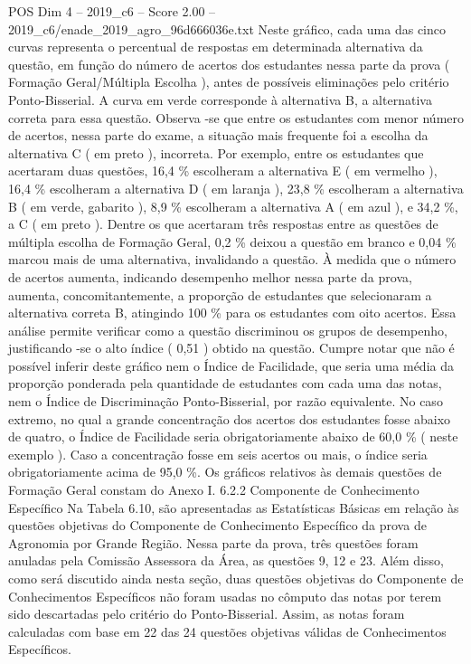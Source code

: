 \begin{textsample}{POS Dim 4 – 2019\_c6 – Score 2.00 – 2019\_c6/enade\_2019\_agro\_96d666036e.txt}
Neste gráfico, cada uma das cinco curvas representa o percentual de respostas em determinada alternativa da questão, em função do número de acertos dos estudantes nessa parte da prova ( Formação Geral/Múltipla Escolha ), antes de possíveis eliminações pelo critério Ponto-Bisserial.
A curva em verde corresponde à alternativa B, a alternativa correta para essa questão.
Observa -se que entre os estudantes com menor número de acertos, nessa parte do exame, a situação mais frequente foi a escolha da alternativa C ( em preto ), incorreta.
Por exemplo, entre os estudantes que acertaram duas questões, 16,4 \% escolheram a alternativa E ( em vermelho ), 16,4 \% escolheram a alternativa D ( em laranja ), 23,8 \% escolheram a alternativa B ( em verde, gabarito ), 8,9 \% escolheram a alternativa A ( em azul ), e 34,2 \%, a C ( em preto ).
Dentre os que acertaram três respostas entre as questões de múltipla escolha de Formação Geral, 0,2 \% deixou a questão em branco e 0,04 \% marcou mais de uma alternativa, invalidando a questão.
À medida que o número de acertos aumenta, indicando desempenho melhor nessa parte da prova, aumenta, concomitantemente, a proporção de estudantes que selecionaram a alternativa correta B, atingindo 100 \% para os estudantes com oito acertos.
Essa análise permite verificar como a questão discriminou os grupos de desempenho, justificando -se o alto índice ( 0,51 ) obtido na questão.
Cumpre notar que não é possível inferir deste gráfico nem o Índice de Facilidade, que seria uma média da proporção ponderada pela quantidade de estudantes com cada uma das notas, nem o Índice de Discriminação Ponto-Bisserial, por razão equivalente.
No caso extremo, no qual a grande concentração dos acertos dos estudantes fosse abaixo de quatro, o Índice de Facilidade seria obrigatoriamente abaixo de 60,0 \% ( neste exemplo ).
Caso a concentração fosse em seis acertos ou mais, o índice seria obrigatoriamente acima de 95,0 \%.
Os gráficos relativos às demais questões de Formação Geral constam do Anexo I. 6.2.2 Componente de Conhecimento Específico Na Tabela 6.10, são apresentadas as Estatísticas Básicas em relação às questões objetivas do Componente de Conhecimento Específico da prova de Agronomia por Grande Região.
Nessa parte da prova, três questões foram anuladas pela Comissão Assessora da Área, as questões 9, 12 e 23.
Além disso, como será discutido ainda nesta seção, duas questões objetivas do Componente de Conhecimentos Específicos não foram usadas no cômputo das notas por terem sido descartadas pelo critério do Ponto-Bisserial.
Assim, as notas foram calculadas com base em 22 das 24 questões objetivas válidas de Conhecimentos Específicos.

\end{textsample}
